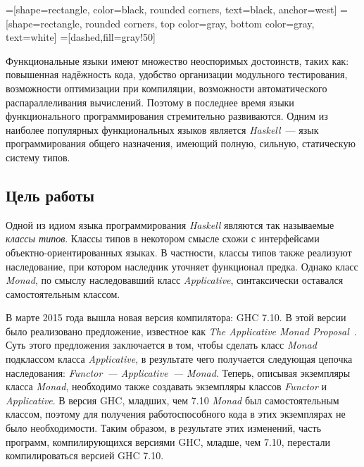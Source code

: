 


    =[shape=rectangle, color=black, rounded corners,%
    text=black, anchor=west]
    =[shape=rectangle, rounded corners,%
    top color=gray,%
    bottom color=gray, text=white]
    =[dashed,fill=gray!50]



\Intro

Функциональные языки имеют множество неоспоримых достоинств, таких как: повышенная надёжность кода, удобство организации модульного тестирования, возможности оптимизации при компиляции, возможности автоматического распараллеливания вычислений. Поэтому в последнее время языки функционального программирования стремительно развиваются. Одним из наиболее популярных функциональных языков является \textit{Haskell}~---  язык программирования общего назначения, имеющий полную, сильную, статическую систему типов.

\subsection*{Цель работы}
Одной из идиом языка программирования \textit{Haskell} являются так называемые \textit{классы типов}. Классы типов в некотором смысле схожи с интерфейсами  объектно-ориентированных языках. В частности, классы типов также реализуют наследование, при котором наследник уточняет функционал предка. Однако класс \textit{Monad}, по смыслу наследовавший класс \textit{Applicative}, синтаксически оставался самостоятельным классом.

В марте 2015 года вышла новая версия компилятора: GHC 7.10. В этой версии было реализовано предложение, известное как \textit{The Applicative Monad Proposal}~\autocite{AMP}. Суть этого предложения заключается в том, чтобы сделать класс \textit{Monad} подклассом класса \textit{Applicative}, в результате чего получается следующая цепочка наследования: \textit{Functor~--- Applicative~--- Monad}. Теперь, описывая экземпляры класса \textit{Monad}, необходимо также создавать экземпляры классов \textit{Functor} и \textit{Applicative}. В версия GHC, младших, чем 7.10 \textit{Monad} был самостоятельным классом, поэтому для получения работоспособного кода в этих экземплярах не было необходимости. Таким образом, в результате этих изменений, часть программ, компилирующихся версиями GHC, младше, чем 7.10, перестали компилироваться версией GHC 7.10.

